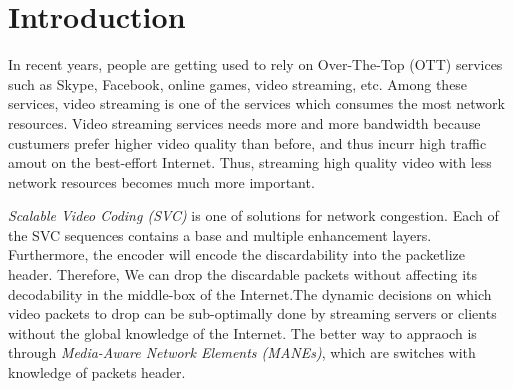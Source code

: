\section{Introduction} \label{sec:introduction}

In recent years, people are getting used to rely on Over-The-Top (OTT) 
services such as Skype, Facebook, online games, video streaming, etc. 
Among these services, video streaming is one of the services which 
consumes the most network resources. Video streaming services needs 
more and more bandwidth because custumers prefer higher video quality than before, and thus incurr high traffic amout on the best-effort Internet. Thus, streaming high quality video with less network resources becomes much more important.

{\em Scalable Video Coding (SVC) }is one of solutions for network congestion. Each of the SVC sequences contains a base and multiple enhancement layers. Furthermore, the encoder will encode the discardability into the packetlize header. Therefore, We can drop the discardable packets without affecting its decodability in the middle-box of the Internet.The dynamic decisions on which video packets to drop can be sub-optimally done by streaming servers or clients without the global knowledge of the Internet. The better way to appraoch is through {\em Media-Aware Network Elements (MANEs)}, which are switches with knowledge of packets header. 


